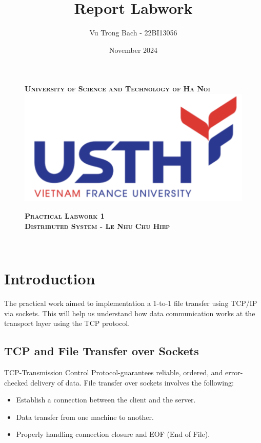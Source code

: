 \documentclass{article}
\title{Report Labwork}
\author{
    Vu Trong Bach - 22BI13056\\  
}
\date{November 2024}
\begin{document}
\begin{figure}[H]
    \textsc{\large \bfseries University of Science and Technology of Ha Noi}\\[0.5cm]
    \centering
    \includegraphics[width=0.8\linewidth]{usth.png}
    \label{fig:project-overview}

    \vspace{1cm}
 
    \textsc{\large \bfseries Practical Labwork 1}\\[1cm]

    \textsc{\Large \bfseries Distributed System - Le Nhu Chu Hiep}\\[1cm]
\end{figure}


\vspace{1cm}
\begin{center}
    \huge \textbf{\thetitle} \\[0.5cm]
    \Large \theauthor [0.5cm]
    \large \thedate
\end{center}

\vspace{4cm}
\tableofcontents

\newpage
\section{Introduction}
The practical work aimed to implementation a 1-to-1 file transfer using TCP/IP via sockets. This will help us understand how data communication works at the transport layer using the TCP protocol.

\subsection{TCP and File Transfer over Sockets}
TCP-Transmission Control Protocol-guarantees reliable, ordered, and error-checked delivery of data. File transfer over sockets involves the following:
\begin{itemize}
    \item Establish a connection between the client and the server.
    \item Data transfer from one machine to another.
    \item Properly handling connection closure and EOF (End of File).
\end{itemize}
\end{document}
